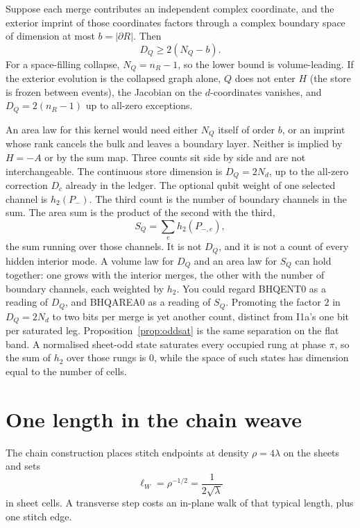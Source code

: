 \begin{proposition}
\label{prop:vol}
Suppose each merge contributes an independent complex coordinate,
and the exterior imprint of those coordinates factors through a complex
boundary space of dimension at most \(b=|\partial R|\).
Then
\[
D_Q\ge 2(N_Q-b).
\]
For a space-filling collapse, \(N_Q=n_R-1\), so the lower bound is
volume-leading.
If the exterior evolution is the collapsed graph alone, \(Q\) does not
enter \(H\) (the store is frozen between events), the Jacobian on the
\(d\)-coordinates vanishes, and \(D_Q=2(n_R-1)\) up to all-zero exceptions.
\end{proposition}

An area law for this kernel would need either \(N_Q\) itself of order \(b\),
or an imprint whose rank cancels the bulk and leaves a boundary layer.
Neither is implied by \(H=-A\) or by the sum map.
Three counts sit side by side and are not interchangeable.
The continuous store dimension is \(D_Q=2N_d\), up to the all-zero
correction \(D_c\) already in the ledger.
The optional qubit weight of one selected channel is \(h_2(P_-)\).
The third count is the number of boundary channels in the sum.
The area sum is the product of the second with the third,
\[
S_Q=\sum_e h_2(P_{-,e}),
\]
the sum running over those channels.
It is not \(D_Q\), and it is not a count of every hidden interior mode.
A volume law for \(D_Q\) and an area law for \(S_Q\) can hold together:
one grows with the interior merges, the other with the number of boundary
channels, each weighted by \(h_2\).
You could regard BHQENT0 as a reading of \(D_Q\), and BHQAREA0 as a reading
of \(S_Q\).
Promoting the factor \(2\) in \(D_Q=2N_d\) to two bits per merge
is yet another count, distinct from I1a's one bit per saturated leg.
Proposition~\ref{prop:oddsat} is the same separation on the flat band.
A normalised sheet-odd state saturates every occupied rung at phase
\(\pi\), so the sum of \(h_2\) over those rungs is \(0\), while the space
of such states has dimension equal to the number of cells.

\section{One length in the chain weave}
\label{sec:ell}

The chain construction places stitch endpoints at density \(\rho=4\lambda\)
on the sheets and sets
\begin{equation}
\label{eq:ell}
\ell_W=\rho^{-1/2}=\frac{1}{2\sqrt{\lambda}}
\end{equation}
in sheet cells.
A transverse step costs an in-plane walk of that typical length, plus one
stitch edge.

